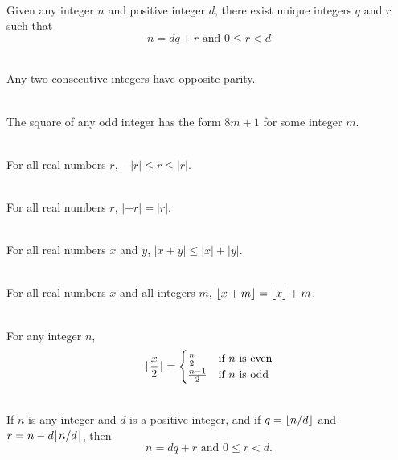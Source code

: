 \documentclass[12pt]{article}
\DeclarePairedDelimiter\floor{\lfloor}{\rfloor}
\begin{document}
\begin{theorem}[4.4.1]
\hfill\\
\normalfont Given any integer $n$ and positive integer $d$, there exist unique integers $q$ and $r$ such
that
\[n=dq+r \text{ and } 0\leq r<d\]
\end{theorem}
\begin{theorem}[4.4.2]
\hfill\\
\normalfont Any two consecutive integers have opposite parity.
\end{theorem}
\begin{theorem}[4.4.3]
\hfill\\
\normalfont The square of any odd integer has the form $8m + 1$ for some integer $m$.
\end{theorem}
\begin{lemma}[4.4.4]
\hfill\\
\normalfont For all real numbers $r$, $-|r| \leq r \leq |r|$.
\end{lemma}
\begin{lemma}[4.4.5]
\hfill\\
\normalfont For all real numbers $r$, $| - r|=|r|$.
\end{lemma}
\begin{theorem}[4.4.6]
\hfill\\
\normalfont For all real numbers $x$ and $y$, $|x + y|\leq|x|+|y|$. 
\clearpage
\end{theorem}
\begin{theorem}[4.5.1]
\hfill\\
\normalfont For all real numbers $x$ and all integers $m$, $\floor*{x+m}=\floor*{x}+ m$.
\end{theorem}
\begin{theorem}[4.5.2]
\hfill\\
\normalfont For any integer $n$,
\begin{equation*}
\floor{\frac{x}{2}}=\begin{cases}
\frac{n}{2}&\text{if }n \text{ is even}\\
\frac{n-1}{2} &\text{if } n \text{ is odd}
\end{cases}
\end{equation*}
\end{theorem}
\begin{theorem}[4.5.3]
\hfill\\
\normalfont If $n$ is any integer and $d$ is a positive integer, and if $q = \floor*{n/d}$ and $r = n - d\floor*{n/d}$, then
\[n = dq + r \text{ and } 0 \leq r < d.\]
\end{theorem}
\end{document}
